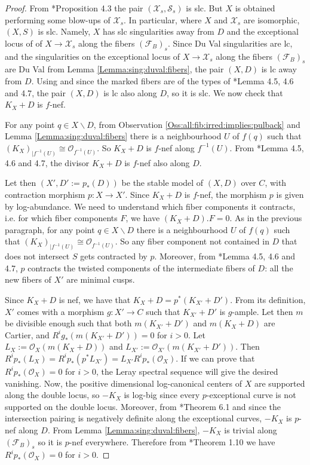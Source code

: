 \documentclass[11pt]{amsart}
\newcommand{\sF}{\mathscr{F}}
\newcommand{\sS}{\mathscr{S}}
\newcommand{\sX}{\mathscr{X}}
\newcommand{\cO}{\mathcal{O}}
\theoremstyle{definition}
\begin{document}
\begin{proof} From \cite{AB2}*{Proposition 4.3} the pair $(\sX_s,\sS_s)$ is slc. But $X$ is obtained performing some blow-ups of $\sX_s$. In particular, where $X$ and $\sX_s$ are isomorphic, $(X,S)$ is slc. Namely, $X$ has slc singularities away from $D$ and the exceptional locus of of $X \to \sX_s$ along the fibers $(\sF_B)_s$.
Since Du Val singularities are lc, and the singularities on the exceptional locus of $X\to \sX_s$ along the fibers $(\sF_B)_s$
are Du Val from Lemma \ref{Lemma:sing:duval:fibers},
the pair $(X,D)$ is lc away from $D$. Using \cite{AB1} and since the marked fibers are of the types
of \cite{AB1}*{Lemma 4.5, 4.6 and 4.7}, the pair $(X,D)$ is lc also along $D$, so it is slc. We now check that $K_X+D$ is $f$-nef.

For any point $q \in X\smallsetminus D$, from Observation \ref{Oss:all:fib:irred:implies:pulback} and
Lemma \ref{Lemma:sing:duval:fibers} there is a neighbourhood $U$ of $f(q)$ such that
$(K_X)_{|f^{-1}(U)} \cong \cO_{f^{-1}(U)}$. So $K_X+D$ is $f$-nef along $f^{-1}(U)$. From
\cite{AB1}*{Lemma 4.5, 4.6 and 4.7}, the divisor $K_X+D$ is $f$-nef also along $D$.

Let then
$(X',D':=p_*(D))$ be the stable model of $(X,D)$ over $C$, with contraction morphism $p:X \to X'$.
Since $K_X+D$ is $f$-nef, the morphism $p$ is given by log-abundance. We need to understand which fiber components
it contracts, i.e. for which fiber components $F$, we have $(K_X+D).F=0$.
As in the previous paragraph, for any point $q \in X\smallsetminus D$ there is a neighbourhood $U$ of $f(q)$ such that
$(K_X)_{|f^{-1}(U)} \cong \cO_{f^{-1}(U)}$. So any fiber component not contained in $D$ that does
not intersect $S$ gets contracted by $p$. Moreover, from
\cite{AB1}*{Lemma 4.5, 4.6 and 4.7}, $p$ contracts the twisted components of the intermediate fibers of $D$: all the new fibers of $X'$ are minimal cusps.

Since $K_X+D$ is nef, we have that
$K_X+D=p^*(K_{X'}+D')$. From its definition, $X'$ comes with a morphism $g:X' \to C$ such that
 $K_{X'}+D'$ is $g$-ample.
 Let then $m$ be divisible enough such that both $m(K_{X'}+D')$ and $m(K_X+D)$
 are Cartier,
 and $R^ig_*(m(K_{X'}+D'))=0$ for $i>0$. Let $L_X:=\cO_X(m(K_X+D))$ and
 $L_{X'}:=\cO_{X'}(m(K_{X'}+D'))$.
 Then $R^ip_*(L_X)=R^ip_*(p^*L_{X'})=L_{X'}R^ip_*(\cO_{X})$. If we can prove that $R^ip_*(\cO_{X})=0$ for $i>0$, the Leray spectral sequence will give the desired vanishing.
 Now, the positive dimensional log-canonical centers of $X$ are supported along the double locus, so $-K_X$ is log-big since every $p$-exceptional curve is not supported on the double locus. Moreover, from \cite{AB1}*{Theorem 6.1} and since the intersection pairing is negatively definite along the exceptional curves, $-K_X$ is $p$-nef along $D$. From Lemma \ref{Lemma:sing:duval:fibers}, $-K_X$ is trivial along $(\sF_B)_s$ so it is $p$-nef everywhere. Therefore from \cite{Fuj-vanishing}*{Theorem 1.10} we have $R^ip_*(\cO_{X})=0$ for $i>0$.
 \end{proof}
\end{document}
